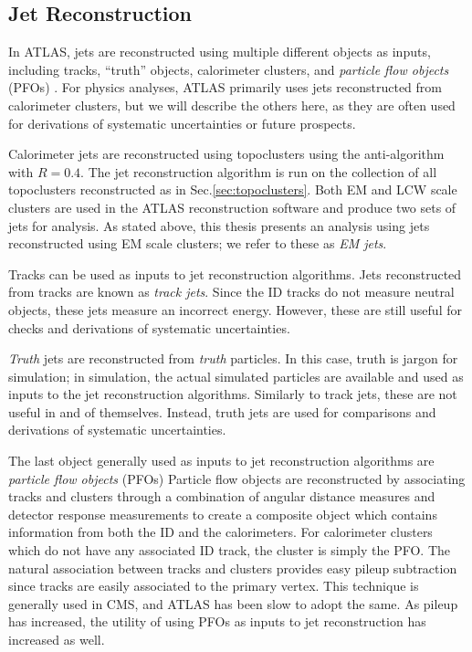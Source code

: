 \subsection{Jet Reconstruction}

In ATLAS, jets are reconstructed using multiple different objects as inputs, including tracks, ``truth'' objects, calorimeter clusters, and \textit{particle flow objects} (PFOs) .
For physics analyses, ATLAS primarily uses jets reconstructed from calorimeter clusters, but we will describe the others here, as they are often used for derivations of systematic uncertainties or future prospects.

Calorimeter jets are reconstructed using topoclusters using the anti-\kt algorithm with $R = 0.4$.
The jet reconstruction algorithm is run on the collection of all topoclusters reconstructed as in Sec.\ref{sec:topoclusters}.
Both EM and LCW scale clusters are used in the ATLAS reconstruction software and produce two sets of jets for analysis.
As stated above, this thesis presents an analysis using jets reconstructed using EM scale clusters; we refer to these as \textit{EM jets}.

Tracks can be used as inputs to jet reconstruction algorithms.
Jets reconstructed from tracks are known as \textit{track jets}.
Since the ID tracks do not measure neutral objects, these jets measure an incorrect energy.
However, these are still useful for checks and derivations of systematic uncertainties.

\textit{Truth} jets are reconstructed from \textit{truth} particles.
In this case, truth is jargon for simulation; in simulation, the actual simulated particles are available and used as inputs to the jet reconstruction algorithms.
Similarly to track jets, these are not useful in and of themselves.
Instead, truth jets are used for comparisons and derivations of systematic uncertainties.

The last object generally used as inputs to jet reconstruction algorithms are \textit{particle flow objects} (PFOs) 
Particle flow objects are reconstructed by associating tracks and clusters through a combination of angular distance measures and detector response measurements to create a composite object which contains information from both the ID and the calorimeters.
For calorimeter clusters which do not have any associated ID track, the cluster is simply the PFO.
The natural association between tracks and clusters provides easy pileup subtraction since tracks are easily associated to the primary vertex.
This technique is generally used in CMS, and ATLAS has been slow to adopt the same.
As pileup has increased, the utility of using PFOs as inputs to jet reconstruction has increased as well.

